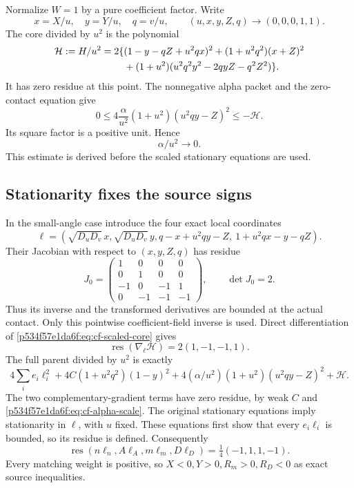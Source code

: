 Normalize \(W=1\) by a pure coefficient factor. Write
\[
x=X/u,\quad y=Y/u,\quad q=v/u,\qquad
(u,x,y,Z,q)\longrightarrow(0,0,0,1,1).
\]
The core divided by \(u^2\) is the polynomial
\begin{align}
\mathcal H:=H/u^2=2\{&
(1-y-qZ+u^2qx)^2+(1+u^2q^2)(x+Z)^2 \notag\\
&+(1+u^2)(u^2q^2y^2-2qyZ-q^2Z^2)\}. \label{p534f57e1da6f:eq:cf-scaled-core}
\end{align}
It has zero residue at this point. The nonnegative alpha packet and
the zero-contact equation give
\[
0\le4\frac{\alpha}{u^2}(1+u^2)(u^2qy-Z)^2
                   \le-\mathcal H.
\]
Its square factor is a positive unit. Hence
\begin{equation}
                         \alpha/u^2\longrightarrow0. \label{p534f57e1da6f:eq:cf-alpha-scale}
\end{equation}
This estimate is derived before the scaled stationary equations are used.

\subsection{Stationarity fixes the source signs}
In the small-angle case introduce the four exact local coordinates
\[
\ell=\left(\sqrt{D_uD_v}\,x,\sqrt{D_uD_v}\,y,
 q-x+u^2qy-Z,\ 1+u^2qx-y-qZ\right).
\]
Their Jacobian with respect to \((x,y,Z,q)\) has residue
\[
J_0=\begin{pmatrix}
1&0&0&0\\0&1&0&0\\-1&0&-1&1\\0&-1&-1&-1
\end{pmatrix},\qquad \det J_0=2.
\]
Thus its inverse and the transformed derivatives are bounded at the
actual contact. Only this pointwise coefficient-field inverse is used.
Direct differentiation of \eqref{p534f57e1da6f:eq:cf-scaled-core} gives
\[
\operatorname{res}(\nabla_\ell\mathcal H)=2(1,-1,-1,1).
\]
The full parent divided by \(u^2\) is exactly
\[
4\sum_i e_i\ell_i^2
 +4C(1+u^2q^2)(1-y)^2
 +4(\alpha/u^2)(1+u^2)(u^2qy-Z)^2+\mathcal H.
\]
The two complementary-gradient terms have zero residue, by weak \(C\)
and \eqref{p534f57e1da6f:eq:cf-alpha-scale}. The original stationary equations imply
stationarity in \(\ell\), with \(u\) fixed. These equations first show
that every \(e_i\ell_i\) is bounded, so its residue is defined. Consequently
\begin{equation}
\operatorname{res}(n\ell_n,A\ell_A,m\ell_m,D\ell_D)
                         =\tfrac14(-1,1,1,-1).        \label{p534f57e1da6f:eq:cf-sign-residue}
\end{equation}
Every matching weight is positive, so \(X<0,Y>0,R_m>0,R_D<0\)
as exact source inequalities.

